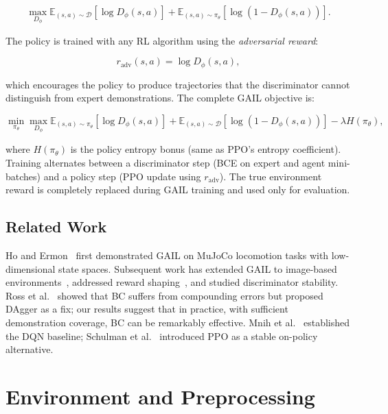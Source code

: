 \documentclass[conference]{IEEEtran}
\begin{document}
\begin{equation}
  \max_{D_\phi}
  \mathbb{E}_{(s,a)\sim\mathcal{D}}[\log D_\phi(s,a)]
  + \mathbb{E}_{(s,a)\sim\pi_\theta}[\log(1 - D_\phi(s,a))].
  \label{eq:disc}
\end{equation}

The policy is trained with any RL algorithm using the \emph{adversarial reward}:

\begin{equation}
  r_{\text{adv}}(s,a) = \log D_\phi(s,a),
  \label{eq:adv_reward}
\end{equation}

which encourages the policy to produce trajectories that the discriminator cannot distinguish
from expert demonstrations.
The complete GAIL objective is:

\begin{equation}
  \min_{\pi_\theta} \max_{D_\phi}
  \mathbb{E}_{(s,a)\sim\pi_\theta}[\log D_\phi(s,a)]
  + \mathbb{E}_{(s,a)\sim\mathcal{D}}[\log(1-D_\phi(s,a))]
  - \lambda H(\pi_\theta),
  \label{eq:gail}
\end{equation}

where $H(\pi_\theta)$ is the policy entropy bonus (same as PPO's entropy coefficient).
Training alternates between a discriminator step (BCE on expert and agent mini-batches)
and a policy step (PPO update using $r_{\text{adv}}$).
The true environment reward is completely replaced during GAIL training and used only for
evaluation.

\subsection{Related Work}

Ho and Ermon~\cite{ho2016gail} first demonstrated GAIL on MuJoCo locomotion tasks with
low-dimensional state spaces.
Subsequent work has extended GAIL to image-based environments~\cite{torabi2018bco},
addressed reward shaping~\cite{fu2018airl}, and studied discriminator stability.
Ross et al.~\cite{ross2011dagger} showed that BC suffers from compounding errors but
proposed DAgger as a fix; our results suggest that in practice, with sufficient
demonstration coverage, BC can be remarkably effective.
Mnih et al.~\cite{mnih2015dqn} established the DQN baseline; Schulman et al.~\cite{schulman2017ppo}
introduced PPO as a stable on-policy alternative.

\section{Environment and Preprocessing}
\label{sec:environment}
\end{document}
